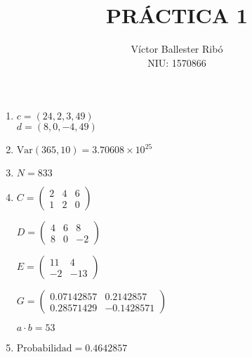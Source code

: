 \documentclass[10pt]{article}
\title{\bfseries\Large PRÁCTICA 1}
\author{Víctor Ballester Ribó\\NIU: 1570866}
\date{\parbox{\linewidth}{\centering
Probabilidad i modelitzación estocástica\endgraf
  Grado en Matemáticas\endgraf
  Universitat Autònoma de Barcelona\endgraf
  28 de septiembre de 2021}}
\begin{document}
\maketitle
\thispagestyle{empty}
\newpage
\setcounter{page}{1}
\restoregeometry
\newpage
\begin{enumerate}[leftmargin=*]
  \item $c=(24,2,3,49)$\\
        $d=(8,0,-4,49)$
  \item $\text{Var}(365,10)=3.70608\times10^{25}$
  \item $N=833$
  \item \hfill

        \vspace{1cm}
        $\displaystyle C=
          \begin{pmatrix}
            2 & 4 & 6 \\
            1 & 2 & 0
          \end{pmatrix}$

        \vspace{1cm}
        $\displaystyle D=
          \begin{pmatrix}
            4 & 6 & 8  \\
            8 & 0 & -2
          \end{pmatrix}$

        \vspace{1cm}
        $\displaystyle E=
          \begin{pmatrix}
            11 & 4   \\
            -2 & -13
          \end{pmatrix}$

        \vspace{1cm}
        $\displaystyle G=
          \begin{pmatrix}
            0.07142857 & 0.2142857  \\
            0.28571429 & -0.1428571
          \end{pmatrix}$

        \vspace{1cm}
        $a\cdot b=53$
  \item $\text{Probabilidad}=0.4642857$
\end{enumerate}
\end{document}
